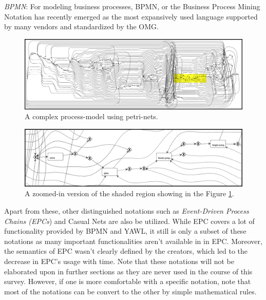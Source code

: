 \textit{BPMN}: For modeling business processes, BPMN, or the Business Process Mining Notation has recently emerged as the most expansively used language supported by many vendors and standardized by the OMG\cite{Repa2013}.

\begin{figure}[h]
	\centering
	\includegraphics[width=2.2\columnwidth]{images/hiRes.jpg}
	\caption{A complex process-model using petri-nets.}
	\label{fig:HiRes}
\end{figure}


\begin{figure}[h]
	\centering
	\includegraphics[width=\columnwidth]{images/hiResZoomed.jpg}
	\caption{A zoomed-in version of the shaded region showing in the Figure \ref{fig:HiRes}.}
	\label{fig:PetriNetImplementation}
\end{figure}
 
Apart from these, other distinguished notations such as \textit{Event-Driven Process Chains (EPCs})\cite{Scheer1994} and Casual Nets are also be utilized. While EPC covers a lot of functionality provided by BPMN and YAWL, it still is only a subset of these notations as many important functionalities aren’t available in in EPC. Moreover, the semantics of EPC wasn’t clearly defined by the creators, which led to the decrease in EPC’s usage with time\cite{Mendling2006}. Note that these notations will not be elaborated upon in further sections as they are never used in the course of this survey. However, if one is more comfortable with a specific notation, note that most of the notations can be convert to the other by simple mathematical rules.


